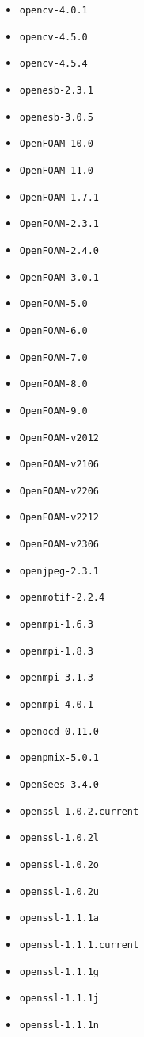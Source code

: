\begin{multicols}{3}
\begin{itemize}
\item \verb|opencv-4.0.1|
\item \verb|opencv-4.5.0|
\item \verb|opencv-4.5.4|
\item \verb|openesb-2.3.1|
\item \verb|openesb-3.0.5|
\item \verb|OpenFOAM-10.0|
\item \verb|OpenFOAM-11.0|
\item \verb|OpenFOAM-1.7.1|
\item \verb|OpenFOAM-2.3.1|
\item \verb|OpenFOAM-2.4.0|
\item \verb|OpenFOAM-3.0.1|
\item \verb|OpenFOAM-5.0|
\item \verb|OpenFOAM-6.0|
\item \verb|OpenFOAM-7.0|
\item \verb|OpenFOAM-8.0|
\item \verb|OpenFOAM-9.0|
\item \verb|OpenFOAM-v2012|
\item \verb|OpenFOAM-v2106|
\item \verb|OpenFOAM-v2206|
\item \verb|OpenFOAM-v2212|
\item \verb|OpenFOAM-v2306|
\item \verb|openjpeg-2.3.1|
\item \verb|openmotif-2.2.4|
\item \verb|openmpi-1.6.3|
\item \verb|openmpi-1.8.3|
\item \verb|openmpi-3.1.3|
\item \verb|openmpi-4.0.1|
\item \verb|openocd-0.11.0|
\item \verb|openpmix-5.0.1|
\item \verb|OpenSees-3.4.0|
\item \verb|openssl-1.0.2.current|
\item \verb|openssl-1.0.2l|
\item \verb|openssl-1.0.2o|
\item \verb|openssl-1.0.2u|
\item \verb|openssl-1.1.1a|
\item \verb|openssl-1.1.1.current|
\item \verb|openssl-1.1.1g|
\item \verb|openssl-1.1.1j|
\item \verb|openssl-1.1.1n|

\end{itemize}
\end{multicols}
